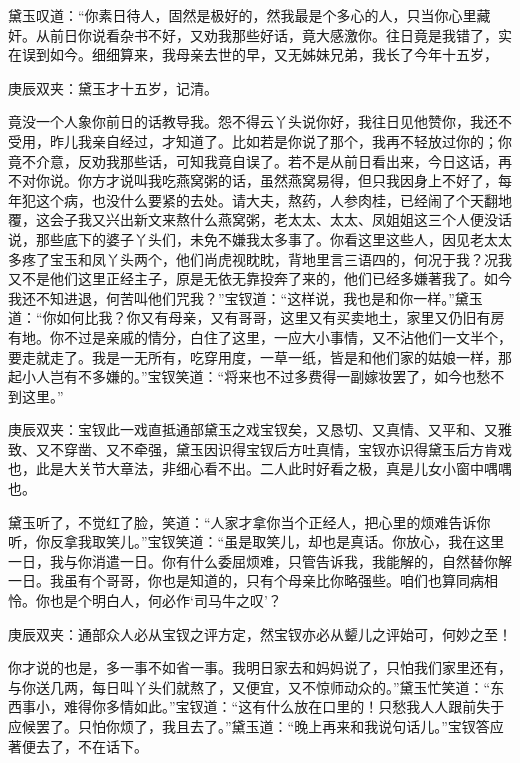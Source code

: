 \begin{parag}
    黛玉叹道：“你素日待人，固然是极好的，然我最是个多心的人，只当你心里藏奸。从前日你说看杂书不好，又劝我那些好话，竟大感激你。往日竟是我错了，实在误到如今。细细算来，我母亲去世的早，又无姊妹兄弟，我长了今年十五岁，\begin{note}庚辰双夹：黛玉才十五岁，记清。\end{note}竟没一个人象你前日的话教导我。怨不得云丫头说你好，我往日见他赞你，我还不受用，昨儿我亲自经过，才知道了。比如若是你说了那个，我再不轻放过你的；你竟不介意，反劝我那些话，可知我竟自误了。若不是从前日看出来，今日这话，再不对你说。你方才说叫我吃燕窝粥的话，虽然燕窝易得，但只我因身上不好了，每年犯这个病，也没什么要紧的去处。请大夫，熬药，人参肉桂，已经闹了个天翻地覆，这会子我又兴出新文来熬什么燕窝粥，老太太、太太、凤姐姐这三个人便没话说，那些底下的婆子丫头们，未免不嫌我太多事了。你看这里这些人，因见老太太多疼了宝玉和凤丫头两个，他们尚虎视眈眈，背地里言三语四的，何况于我？况我又不是他们这里正经主子，原是无依无靠投奔了来的，他们已经多嫌著我了。如今我还不知进退，何苦叫他们咒我？”宝钗道：“这样说，我也是和你一样。”黛玉道：“你如何比我？你又有母亲，又有哥哥，这里又有买卖地土，家里又仍旧有房有地。你不过是亲戚的情分，白住了这里，一应大小事情，又不沾他们一文半个，要走就走了。我是一无所有，吃穿用度，一草一纸，皆是和他们家的姑娘一样，那起小人岂有不多嫌的。”宝钗笑道：“将来也不过多费得一副嫁妆罢了，如今也愁不到这里。”\begin{note}庚辰双夹：宝钗此一戏直抵通部黛玉之戏宝钗矣，又恳切、又真情、又平和、又雅致、又不穿凿、又不牵强，黛玉因识得宝钗后方吐真情，宝钗亦识得黛玉后方肯戏也，此是大关节大章法，非细心看不出。二人此时好看之极，真是儿女小窗中喁喁也。\end{note}黛玉听了，不觉红了脸，笑道：“人家才拿你当个正经人，把心里的烦难告诉你听，你反拿我取笑儿。”宝钗笑道：“虽是取笑儿，却也是真话。你放心，我在这里一日，我与你消遣一日。你有什么委屈烦难，只管告诉我，我能解的，自然替你解一日。我虽有个哥哥，你也是知道的，只有个母亲比你略强些。咱们也算同病相怜。你也是个明白人，何必作‘司马牛之叹’？\begin{note}庚辰双夹：通部众人必从宝钗之评方定，然宝钗亦必从颦儿之评始可，何妙之至！\end{note}你才说的也是，多一事不如省一事。我明日家去和妈妈说了，只怕我们家里还有，与你送几两，每日叫丫头们就熬了，又便宜，又不惊师动众的。”黛玉忙笑道：“东西事小，难得你多情如此。”宝钗道：“这有什么放在口里的！只愁我人人跟前失于应候罢了。只怕你烦了，我且去了。”黛玉道：“晚上再来和我说句话儿。”宝钗答应著便去了，不在话下。
\end{parag}


